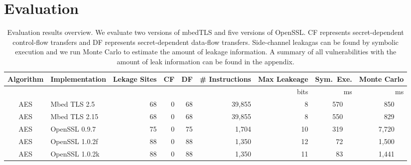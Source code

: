 \section{Evaluation}
\label{res_overview}

\begin{table}
    \centering
    \caption{Evaluation results overview. We evaluate two versions of mbedTLS and five
        versions of OpenSSL\@. CF represents secret-dependent control-flow transfers and
        DF represents secret-dependent data-flow transfers. Side-channel leakagas can
        be found by symbolic execution and we run Monte Carlo to estimate the amount
        of leakage information. A summary of all vulnerabilities with the amount of
        leak information can be found in the appendix.
    }\label{table:over_result}
    \newlength{\x}
    \newlength{\y}
    \settowidth{\x}{~~}
    \settowidth{\y}{m}
    \addtolength{\x}{-1\y}
    \newcommand{\foo}{\mbox{\hspace*{\the\x}}}
    \begin{tabular}{clrrrrrrr}
        \hline
        \textbf{Algorithm} & \textbf{Implementation}  & \textbf{Lekage Sites} & \textbf{CF}         & \textbf{DF}
                           & \textbf{\# Instructions} & \textbf{Max Leakeage} & \textbf{Sym.\ Exe.} & \textbf{Monte Carlo}                                                    \\\hline
                           &                          &                       &                     &                      &             & bits & ms        & ms              \\\cline{7-9}
        AES                & Mbed TLS 2.5             & 68                    & 0                   & 68                   & 39,855      & 8    & 570 ~~    & 850 ~~          \\
        AES                & Mbed TLS 2.15            & 68                    & 0                   & 68                   & 39,855      & 8    & 550 ~~    & 829 ~~          \\
        AES                & OpenSSL 0.9.7            & 75                    & 0                   & 75                   & 1,704       & 10   & 319 ~~    & 7,720 ~~        \\
        AES                & OpenSSL 1.0.2f           & 88                    & 0                   & 88                   & 1,350       & 12   & 72 ~~     & 1,500 ~~        \\
        AES                & OpenSSL 1.0.2k           & 88                    & 0                   & 88                   & 1,350       & 11   & 83 ~~     & 1,441 ~~        \\

\end{tabular}
\end{table}
